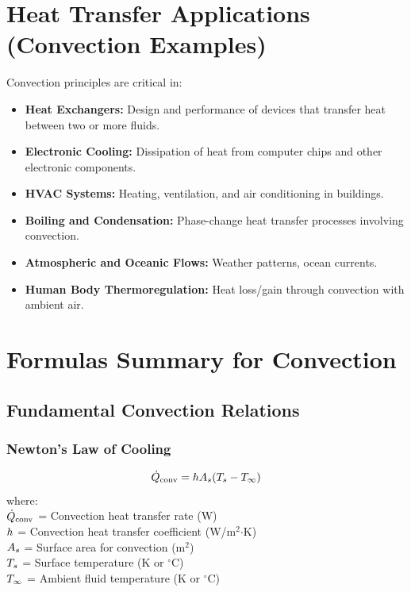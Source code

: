 \section{Heat Transfer Applications (Convection Examples)}
Convection principles are critical in:
\begin{itemize}
    \item \textbf{Heat Exchangers:} Design and performance of devices that transfer heat between two or more fluids.
    \item \textbf{Electronic Cooling:} Dissipation of heat from computer chips and other electronic components.
    \item \textbf{HVAC Systems:} Heating, ventilation, and air conditioning in buildings.
    \item \textbf{Boiling and Condensation:} Phase-change heat transfer processes involving convection.
    \item \textbf{Atmospheric and Oceanic Flows:} Weather patterns, ocean currents.
\item \textbf{Human Body Thermoregulation:} Heat loss/gain through convection with ambient air.
\end{itemize}

\section{Formulas Summary for Convection}

\subsection{Fundamental Convection Relations}
\subsubsection*{Newton's Law of Cooling}
\begin{equation}
    \dot{Q}_{\text{conv}} = h A_s (T_s - T_{\infty})
\end{equation}
where: \\
$\dot{Q}_{\text{conv}}$ = Convection heat transfer rate (W) \\
$h$ = Convection heat transfer coefficient (W/m$^2$$\cdot$K) \\
$A_s$ = Surface area for convection (m$^2$) \\
$T_s$ = Surface temperature (K or $^\circ$C) \\
$T_{\infty}$ = Ambient fluid temperature (K or $^\circ$C)


